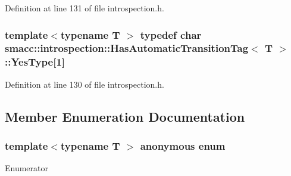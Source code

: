 Definition at line 131 of file introspection.\+h.

\subsubsection[{\texorpdfstring{Yes\+Type}{YesType}}]{\setlength{\rightskip}{0pt plus 5cm}template$<$typename T $>$ typedef char {\bf smacc\+::introspection\+::\+Has\+Automatic\+Transition\+Tag}$<$ T $>$\+::Yes\+Type\mbox{[}1\mbox{]}\hspace{0.3cm}{\ttfamily [private]}}\hypertarget{classsmacc_1_1introspection_1_1HasAutomaticTransitionTag_a750a08a185de0fa20331ba7cfc531dde}{}\label{classsmacc_1_1introspection_1_1HasAutomaticTransitionTag_a750a08a185de0fa20331ba7cfc531dde}


Definition at line 130 of file introspection.\+h.



\subsection{Member Enumeration Documentation}
\subsubsection[{\texorpdfstring{anonymous enum}{anonymous enum}}]{\setlength{\rightskip}{0pt plus 5cm}template$<$typename T $>$ anonymous enum}\hypertarget{classsmacc_1_1introspection_1_1HasAutomaticTransitionTag_aa4d176f174bc660b4705a0ff3874d4ac}{}\label{classsmacc_1_1introspection_1_1HasAutomaticTransitionTag_aa4d176f174bc660b4705a0ff3874d4ac}
\begin{Desc}
\item[Enumerator]\par
\begin{description}
\item[{\em 
value\hypertarget{classsmacc_1_1introspection_1_1HasAutomaticTransitionTag_aa4d176f174bc660b4705a0ff3874d4aca4e813bb149aec14797ea59791542e845}{}\label{classsmacc_1_1introspection_1_1HasAutomaticTransitionTag_aa4d176f174bc660b4705a0ff3874d4aca4e813bb149aec14797ea59791542e845}
}]\end{description}
\end{Desc}


